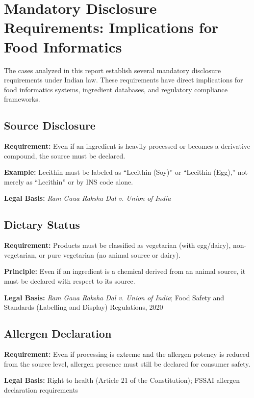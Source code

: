 \documentclass[12pt,a4paper]{article}
\begin{document}
\section{Mandatory Disclosure Requirements: Implications for Food Informatics}

The cases analyzed in this report establish several mandatory disclosure requirements under Indian law. These requirements have direct implications for food informatics systems, ingredient databases, and regulatory compliance frameworks.

\subsection{Source Disclosure}

\textbf{Requirement:} Even if an ingredient is heavily processed or becomes a derivative compound, the source must be declared.

\textbf{Example:} Lecithin must be labeled as ``Lecithin (Soy)'' or ``Lecithin (Egg),'' not merely as ``Lecithin'' or by INS code alone.

\textbf{Legal Basis:} \textit{Ram Gaua Raksha Dal v. Union of India}

\subsection{Dietary Status}

\textbf{Requirement:} Products must be classified as vegetarian (with egg/dairy), non-vegetarian, or pure vegetarian (no animal source or dairy).

\textbf{Principle:} Even if an ingredient is a chemical derived from an animal source, it must be declared with respect to its source.

\textbf{Legal Basis:} \textit{Ram Gaua Raksha Dal v. Union of India}; Food Safety and Standards (Labelling and Display) Regulations, 2020

\subsection{Allergen Declaration}

\textbf{Requirement:} Even if processing is extreme and the allergen potency is reduced from the source level, allergen presence must still be declared for consumer safety.

\textbf{Legal Basis:} Right to health (Article 21 of the Constitution); FSSAI allergen declaration requirements
\end{document}
